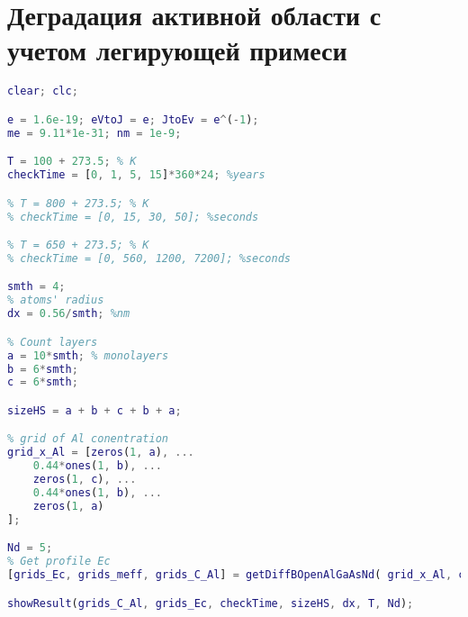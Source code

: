 \chapter{Деградация активной области с учетом легирующей примеси}
\label{app:DaNd}
\begin{lstlisting}[style=realcode,language=Matlab,caption={Деградация активной области с учетом легирующей примеси},label={lst:DaNd}]
clear; clc;

e = 1.6e-19; eVtoJ = e; JtoEv = e^(-1); 
me = 9.11*1e-31; nm = 1e-9;

T = 100 + 273.5; % K
checkTime = [0, 1, 5, 15]*360*24; %years

% T = 800 + 273.5; % K
% checkTime = [0, 15, 30, 50]; %seconds

% T = 650 + 273.5; % K
% checkTime = [0, 560, 1200, 7200]; %seconds

smth = 4;
% atoms' radius
dx = 0.56/smth; %nm

% Count layers
a = 10*smth; % monolayers
b = 6*smth;
c = 6*smth;

sizeHS = a + b + c + b + a;

% grid of Al conentration
grid_x_Al = [zeros(1, a), ...
	0.44*ones(1, b), ...
	zeros(1, c), ...
	0.44*ones(1, b), ...
	zeros(1, a)
];

Nd = 5;
% Get profile Ec
[grids_Ec, grids_meff, grids_C_Al] = getDiffBOpenAlGaAsNd( grid_x_Al, checkTime, dx*nm, T, Nd );

showResult(grids_C_Al, grids_Ec, checkTime, sizeHS, dx, T, Nd);
\end{lstlisting}


